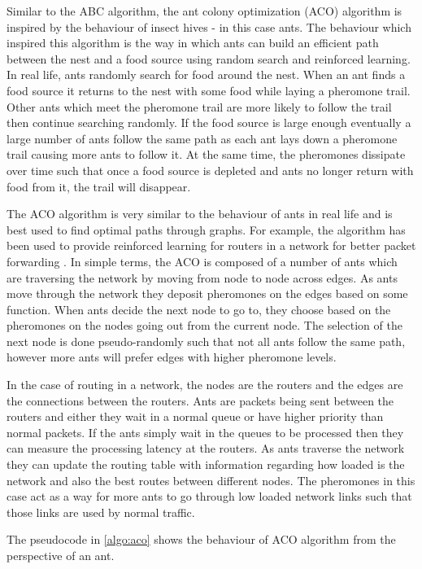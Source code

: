 Similar to the ABC algorithm, the ant colony optimization (ACO) algorithm is inspired by the behaviour of insect hives - in this case ants. The behaviour which inspired this algorithm is the way in which ants can build an efficient path between the nest and a food source using random search and reinforced learning. In real life, ants randomly search for food around the nest. When an ant finds a food source it returns to the nest with some food while laying a pheromone trail. Other ants which meet the pheromone trail are more likely to follow the trail then continue searching randomly. If the food source is large enough eventually a large number of ants follow the same path as each ant lays down a pheromone trail causing more ants to follow it. At the same time, the pheromones dissipate over time such that once a food source is depleted and ants no longer return with food from it, the trail will disappear. 

The ACO algorithm is very similar to the behaviour of ants in real life and is best used to find optimal paths through graphs. For example, the algorithm has been used to provide reinforced learning for routers in a network for better packet forwarding \cite{selforg:aco}. In simple terms, the ACO is composed of a number of ants which are traversing the network by moving from node to node across edges. As ants move through the network they deposit pheromones on the edges based on some function. When ants decide the next node to go to, they choose based on the pheromones on the nodes going out from the current node. The selection of the next node is done pseudo-randomly such that not all ants follow the same path, however more ants will prefer edges with higher pheromone levels. 

In the case of routing in a network, the nodes are the routers and the edges are the connections between the routers. Ants are packets being sent between the routers and either they wait in a normal queue or have higher priority than normal packets. If the ants simply wait in the queues to be processed then they can measure the processing latency at the routers. As ants traverse the network they can update the routing table with information regarding how loaded is the network and also the best routes between different nodes. The pheromones in this case act as a way for more ants to go through low loaded network links such that those links are used by normal traffic.

The pseudocode in \ref{algo:aco} shows the behaviour of ACO algorithm from the perspective of an ant.

